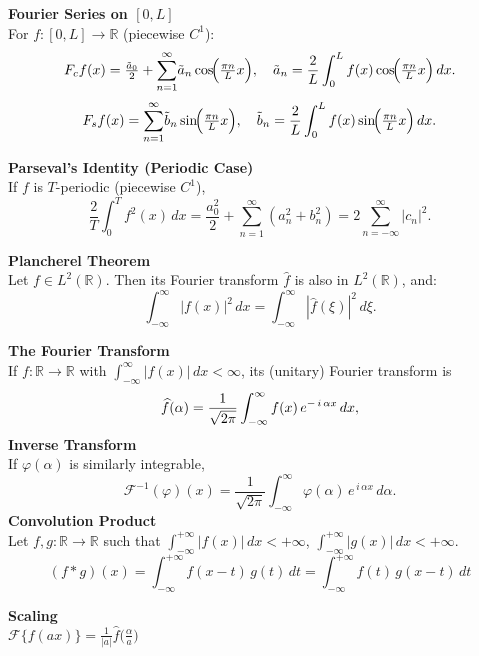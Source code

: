 \documentclass[8pt]{article}
\begin{document}
\begin{multicols}{2}
\noindent \textbf{Fourier Series on $[0,L]$}\\
For $f:[0,L]\to \mathbb{R}$ (piecewise $C^1$):
\[
  F_{c}f(x)=\tfrac{\tilde a_{0}}{2} + \sum_{n=1}^{\infty}\!\tilde a_{n}\cos\!\Bigl(\tfrac{\pi n}{L}x\Bigr),
  \quad \tilde a_{n}=\frac{2}{L}\int_{0}^{L} f(x)\cos\!\Bigl(\tfrac{\pi n}{L}x\Bigr)\,dx.
\]
\[
  F_{s}f(x)=\sum_{n=1}^{\infty}\!\tilde b_{n}\sin\!\Bigl(\tfrac{\pi n}{L}x\Bigr),
  \quad \tilde b_{n}=\frac{2}{L}\int_{0}^{L} f(x)\sin\!\Bigl(\tfrac{\pi n}{L}x\Bigr)\,dx.
\]

\noindent \textbf{Parseval's Identity (Periodic Case)}\\
If $f$ is $T$-periodic (piecewise $C^1$),
\[
  \frac{2}{T}\int_{0}^{T} f^{2}(x)\,dx
  = \frac{a_{0}^{2}}{2} + \sum_{n=1}^{\infty}(a_{n}^{2}+b_{n}^{2})
  = 2\sum_{n=-\infty}^{\infty}\!\!\bigl|c_{n}\bigr|^{2}.
\]

\noindent \textbf{Plancherel Theorem}\\
Let $f \in L^2(\mathbb{R})$. Then its Fourier transform $\hat{f}$ is also in $L^2(\mathbb{R})$, and:
\[
  \int_{-\infty}^\infty |f(x)|^2 \, dx
  = \int_{-\infty}^\infty |\hat{f}(\xi)|^2 \, d\xi.
\]

\noindent \textbf{The Fourier Transform}\\
If $f:\mathbb{R}\to\mathbb{R}$ with $\int_{-\infty}^{\infty}\!|f(x)|\,dx<\infty$, its (unitary) Fourier transform is
\[
  \widehat{f}(\alpha)=\frac{1}{\sqrt{2\pi}}
  \int_{-\infty}^{\infty} f(x)\, e^{-\,i\,\alpha x}\,dx, \vspace{-10px}
\]
\noindent \textbf{Inverse Transform}\\
If $\varphi(\alpha)$ is similarly integrable,
\[
  \mathcal{F}^{-1}(\varphi)(x)= \frac{1}{\sqrt{2\pi}}
  \int_{-\infty}^{\infty}\!\varphi(\alpha)\,e^{\,i\,\alpha x}\,d\alpha.
\]
\noindent \textbf{Convolution Product}\\
Let \(f,g:\mathbb{R} \to \mathbb{R}\) such that
\(\int_{-\infty}^{+\infty} |f(x)|\,dx < +\infty\),
\(\int_{-\infty}^{+\infty} |g(x)|\,dx < +\infty\). \vspace{-5px}
\[
  (f * g)(x)
  = \int_{-\infty}^{+\infty} f(x - t)\,g(t)\,dt
  = \int_{-\infty}^{+\infty} f(t)\,g(x - t)\,dt
\]

\vfill

\setlength{\columnsep}{-70pt} %
\hspace{-15px}
\normalsize
\begin{minipage}[htp]{0.55\textwidth}
  \begin{multicols}{2}
    \textbf{Scaling} \\
    $\mathcal{F}\{f(ax)\} = \frac{1}{|a|} \hat{f}\!\bigl(\tfrac{\alpha}{a}\bigr)$ \\[4pt]


\end{multicols}
\end{minipage}
\end{multicols}
\end{document}
